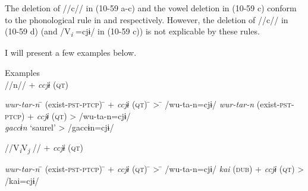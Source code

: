 The deletion of //c// in (10-59 a-c) and the vowel deletion in (10-59 c) conform to the phonological rule in  and  respectively. However, the deletion of //c// in (10-59 d) (and /V\textit{\textsubscript{i} }=cjɨ/ in (10-59 c)) is not explicable by these rules.

I will present a few examples below.

\ea\label{ex:10.60}   Examples\\
  \ea //n// + \textit{ccjɨ} (\textsc{qt})\\
  \begin{tabbing}
  \textit{wur-tar-n} \hspace{\tabcolsep}\=\hspace{\tabcolsep} (exist-\textsc{pst}-\textsc{ptcp}) \hspace{\tabcolsep}\=\hspace{\tabcolsep} +  \textit{ccjɨ}  (\textsc{qt}) \hspace{\tabcolsep}\=\hspace{\tabcolsep} > \hspace{\tabcolsep}\=\hspace{\tabcolsep} /wu-ta-n=cjɨ/\kill
  \textit{wur-tar-n} \> (exist-\textsc{pst}-\textsc{ptcp}) \> +  \textit{ccjɨ}  (\textsc{qt}) \> > \> /wu-ta-n=cjɨ/\\
  \textit{gaccɨn} \> ‘saurel’  \> \>      > \> /gaccɨn=cjɨ/
  \end{tabbing}

  \ex //V\textit{\textsubscript{i}}V\textit{\textsubscript{j} }// + \textit{ccjɨ} (\textsc{qt})\\
  \begin{tabbing}
  \textit{wur-tar-n} \hspace{\tabcolsep}\=\hspace{\tabcolsep} (exist-\textsc{pst}-\textsc{ptcp}) \hspace{\tabcolsep}\=\hspace{\tabcolsep} +  \textit{ccjɨ}  (\textsc{qt}) \hspace{\tabcolsep}\=\hspace{\tabcolsep} > \hspace{\tabcolsep}\=\hspace{\tabcolsep} /wu-ta-n=cjɨ/\kill
  \textit{kai} \> (\textsc{dub}) \> +  \textit{ccjɨ}  (\textsc{qt}) \> > \> /kai=cjɨ/
  \end{tabbing}

